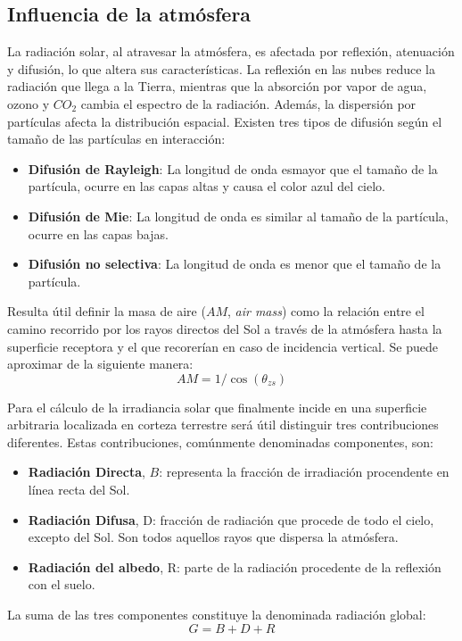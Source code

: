 \subsection{Influencia de la atmósfera}
\label{sec:org26bfcde}
La radiación solar, al atravesar la atmósfera, es afectada por reflexión, atenuación y difusión, lo que altera sus características. La reflexión en las nubes reduce la radiación que llega a la Tierra, mientras que la absorción por vapor de agua, ozono y \(CO_2\) cambia el espectro de la radiación. Además, la dispersión por partículas afecta la distribución espacial. Existen tres tipos de difusión según el tamaño de las partículas en interacción:
\begin{itemize}
\item \textbf{Difusión de Rayleigh}: La longitud de onda esmayor que el tamaño de la partícula, ocurre en las capas altas y causa el color azul del cielo.
\item \textbf{Difusión de Mie}: La longitud de onda es similar al tamaño de la partícula, ocurre en las capas bajas.
\item \textbf{Difusión no selectiva}: La longitud de onda es menor que el tamaño de la partícula.
\end{itemize}

Resulta útil definir la masa de aire (\(AM\), \emph{air mass}) como la relación entre el camino recorrido por los rayos directos del Sol a través de la atmósfera hasta la superficie receptora y el que recorerían en caso de incidencia vertical. Se puede aproximar de la siguiente manera: 
\begin{equation}
AM = 1/\cos(\theta_{zs})
\end{equation}

Para el cálculo de la irradiancia solar que finalmente incide en una superficie arbitraria localizada en corteza terrestre será útil distinguir tres contribuciones diferentes. Estas contribuciones, comúnmente denominadas componentes, son:
\begin{itemize}
\item \textbf{Radiación Directa}, \(B\): representa la fracción de irradiación procendente en línea recta del Sol. 
\item \textbf{Radiación Difusa}, D: fracción de radiación que procede de todo el cielo, excepto del Sol. Son todos aquellos rayos que dispersa la atmósfera.
\item \textbf{Radiación del albedo}, R: parte de la radiación procedente de la reflexión con el suelo.
\end{itemize}
La suma de las tres componentes constituye la denominada radiación global: 
\begin{equation}
G = B + D + R
\label{eq:comp_rad}
\end{equation}


